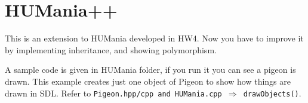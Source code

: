 \documentclass[a4paper,12pt]{article}
\begin{document}
%
%	
%	

	

	\section{HUMania++}
	
	This is an extension to HUMania developed in HW4. Now you have to improve it by implementing inheritance, and showing polymorphism. 
	
	A sample code is given in HUMania folder, if you run it you can see a pigeon is drawn. This example creates just one object of Pigeon to show how things are drawn in SDL. Refer to \texttt{Pigeon.hpp/cpp and HUMania.cpp $ \Rightarrow $ drawObjects()}.
	
\end{document}
